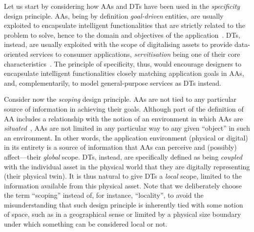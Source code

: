 Let us start by considering how AAs and DTs have been used in the \emph{specificity} design principle. 
AAs, being by definition \emph{goal-driven} entities, are usually exploited to encapsulate intelligent functionalities that are strictly related to the problem to solve, hence to the domain and objectives of the application~\cite{DBLP:books/daglib/0077762}. 
DTs, instead, are usually exploited with the scope of digitalising assets to provide data-oriented services to consumer applications, \emph{servitisation} being one of their core characteristics~\cite{the-digita-twin-Crespi-2023}. 
The principle of specificity, thus, would encourage designers to encapsulate intelligent functionalities closely matching application goals in AAs, and, complementarily, to model general-purpose services as DTs instead. 

Consider now the \emph{scoping} design principle. 
AAs are not tied to any particular source of information in achieving their goals. 
Although part of the definition of AA includes a relationship with the notion of an environment in which AAs are \emph{situated}~\cite{DBLP:journals/ker/WooldridgeJ95}, AAs are not limited in any particular way to any given ``object'' in such an environment. 
In other words, the application environment (physical or digital) in its entirety is a source of information that AAs can perceive and (possibly) affect---their \emph{global} scope. 
%
DTs, instead, are specifically defined as being \emph{coupled} with the individual asset in the physical world that they are digitally representing (their physical twin). 
It is thus natural to give DTs a \emph{local} scope, limited to the information available from this physical asset. 
Note that we deliberately choose the term ``scoping'' instead of, for instance, ``locality'', to avoid the misunderstanding that such design principle is inherently tied with some notion of space, such as in a geographical sense or limited by a physical size boundary under which something can be considered local or not.
%


